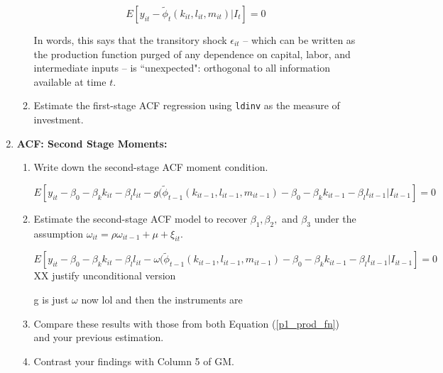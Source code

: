 \documentclass{article}
\begin{document}
\begin{enumerate}
\begin{enumerate}
\begin{answer}

$$E[y_{it} - \tilde{\phi}_t(k_{it},l_{it},m_{it})|I_t]=0$$

In words, this says that the transitory shock $\epsilon_{it}$ -- which can be written as the production function purged of any dependence on capital, labor, and intermediate inputs -- is ``unexpected": orthogonal to all information available at time $t$.
\end{answer}

\item Estimate the first-stage ACF regression using \texttt{ldinv} as the measure of investment.



\end{enumerate}

\item \textbf{ACF: Second Stage Moments:}

\begin{enumerate}
\item Write down the second-stage ACF moment condition.

\begin{answer}
$$E[y_{it} - \beta_0 - \beta_k k_{it} - \beta_l l_{it} -g(\tilde{\phi}_{t-1}(k_{it-1},l_{it-1},m_{it-1}) - \beta_0 - \beta_k k_{it-1} - \beta_l l_{it-1}|I_{it-1}]=0$$
\end{answer}
\item Estimate the second-stage ACF model to recover $\beta_1, \beta_2,$ and $\beta_3$ under the assumption $\omega_{it} = \rho \omega_{i t-1} + \mu + \xi_{it}.$

 \begin{answer}

 $$E[y_{it} - \beta_0 - \beta_k k_{it} - \beta_l l_{it} -\omega(\tilde{\phi}_{t-1}(k_{it-1},l_{it-1},m_{it-1}) - \beta_0 - \beta_k k_{it-1} - \beta_l l_{it-1}|I_{it-1}]=0$$
XX justify 
unconditional version 

 \end{answer}
g is just $\omega$ now lol and then the instruments are 

\item Compare these results with those from both Equation (\ref{p1_prod_fn}) and your previous
estimation.


\item Contrast your findings with Column 5 of GM.

\end{enumerate}



\end{enumerate}
\end{document}
